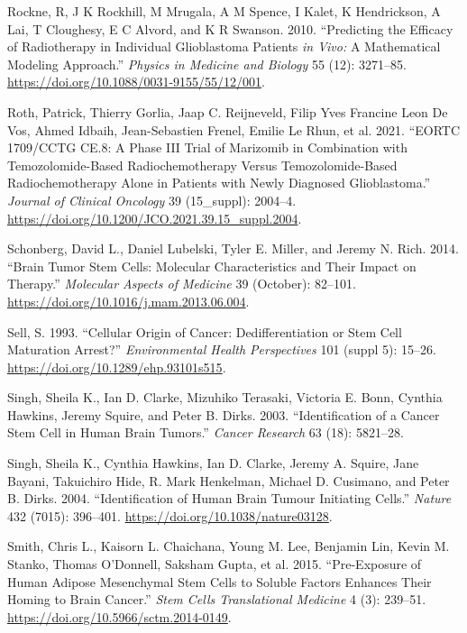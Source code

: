 \documentclass[
  letterpaper,
]{scrreprt}
\newlength{\cslhangindent}
\newenvironment{CSLReferences}[2] %
 {\begin{list}{}{%
  \setlength{\itemindent}{0pt}
  \setlength{\leftmargin}{0pt}
  \setlength{\parsep}{0pt}
  \ifodd #1
   \setlength{\leftmargin}{\cslhangindent}
   \setlength{\itemindent}{-1\cslhangindent}
  \fi
  \setlength{\itemsep}{#2\baselineskip}}}
 {\end{list}}
\theoremstyle{definition}
\theoremstyle{remark}
\begin{document}
\begin{CSLReferences}{1}{0}
Rockne, R, J K Rockhill, M Mrugala, A M Spence, I Kalet, K Hendrickson,
A Lai, T Cloughesy, E C Alvord, and K R Swanson. 2010. {``Predicting the
Efficacy of Radiotherapy in Individual Glioblastoma Patients {\emph{in
Vivo:}} A Mathematical Modeling Approach.''} \emph{Physics in Medicine
and Biology} 55 (12): 3271--85.
\url{https://doi.org/10.1088/0031-9155/55/12/001}.

Roth, Patrick, Thierry Gorlia, Jaap C. Reijneveld, Filip Yves Francine
Leon De Vos, Ahmed Idbaih, Jean-Sebastien Frenel, Emilie Le Rhun, et al.
2021. {``EORTC 1709/CCTG CE.8: A Phase III Trial of Marizomib in
Combination with Temozolomide-Based Radiochemotherapy Versus
Temozolomide-Based Radiochemotherapy Alone in Patients with Newly
Diagnosed Glioblastoma.''} \emph{Journal of Clinical Oncology} 39
(15{\_}suppl): 2004--4.
\url{https://doi.org/10.1200/JCO.2021.39.15_suppl.2004}.

Schonberg, David L., Daniel Lubelski, Tyler E. Miller, and Jeremy N.
Rich. 2014. {``Brain Tumor Stem Cells: Molecular Characteristics and
Their Impact on Therapy.''} \emph{Molecular Aspects of Medicine} 39
(October): 82--101. \url{https://doi.org/10.1016/j.mam.2013.06.004}.

Sell, S. 1993. {``Cellular Origin of Cancer: Dedifferentiation or Stem
Cell Maturation Arrest?''} \emph{Environmental Health Perspectives} 101
(suppl 5): 15--26. \url{https://doi.org/10.1289/ehp.93101s515}.

Singh, Sheila K., Ian D. Clarke, Mizuhiko Terasaki, Victoria E. Bonn,
Cynthia Hawkins, Jeremy Squire, and Peter B. Dirks. 2003.
{``Identification of a Cancer Stem Cell in Human Brain Tumors.''}
\emph{Cancer Research} 63 (18): 5821--28.

Singh, Sheila K., Cynthia Hawkins, Ian D. Clarke, Jeremy A. Squire, Jane
Bayani, Takuichiro Hide, R. Mark Henkelman, Michael D. Cusimano, and
Peter B. Dirks. 2004. {``Identification of Human Brain Tumour Initiating
Cells.''} \emph{Nature} 432 (7015): 396--401.
\url{https://doi.org/10.1038/nature03128}.

Smith, Chris L., Kaisorn L. Chaichana, Young M. Lee, Benjamin Lin, Kevin
M. Stanko, Thomas O'Donnell, Saksham Gupta, et al. 2015. {``Pre-Exposure
of Human Adipose Mesenchymal Stem Cells to Soluble Factors Enhances
Their Homing to Brain Cancer.''} \emph{Stem Cells Translational
Medicine} 4 (3): 239--51. \url{https://doi.org/10.5966/sctm.2014-0149}.


\end{CSLReferences}
\end{document}
